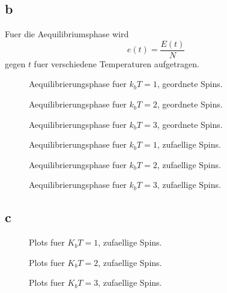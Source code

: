\documentclass{scrartcl}
\begin{document}
\subsection*{b}
Fuer die Aequilibriumsphase wird
\begin{equation}
  e(t) = \frac{E(t)}{N}
\end{equation}
gegen $t$ fuer verschiedene Temperaturen aufgetragen.

\begin{figure}[ht]
  \centering
  \caption{Aequilibrierungsphase fuer $k_b T = 1$, geordnete Spins.}
\end{figure}
\begin{figure}[ht]
  \centering
  \caption{Aequilibrierungsphase fuer $k_b T = 2$, geordnete Spins.}
\end{figure}
\begin{figure}[ht]
  \centering
  \caption{Aequilibrierungsphase fuer $k_b T = 3$, geordnete Spins.}
\end{figure}
\begin{figure}[ht]
  \centering
  \caption{Aequilibrierungsphase fuer $k_b T = 1$, zufaellige Spins.}
\end{figure}
\begin{figure}[ht]
  \centering
  \caption{Aequilibrierungsphase fuer $k_b T = 2$, zufaellige Spins.}
\end{figure}
\begin{figure}[ht]
  \centering
  \caption{Aequilibrierungsphase fuer $k_b T = 3$, zufaellige Spins.}
\end{figure}
\subsection*{c}
\begin{figure}[ht]
  \centering
  \caption{Plots fuer $K_b T = 1$, zufaellige Spins.}
\end{figure}
\begin{figure}[ht]
  \centering
  \caption{Plots fuer $K_b T = 2$, zufaellige Spins.}
\end{figure}
\begin{figure}[ht]
  \centering
  \caption{Plots fuer $K_b T = 3$, zufaellige Spins.}
\end{figure}
\end{document}
